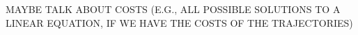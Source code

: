 MAYBE TALK ABOUT COSTS (E.G., ALL POSSIBLE SOLUTIONS TO A LINEAR EQUATION, IF WE HAVE THE COSTS OF THE TRAJECTORIES)



